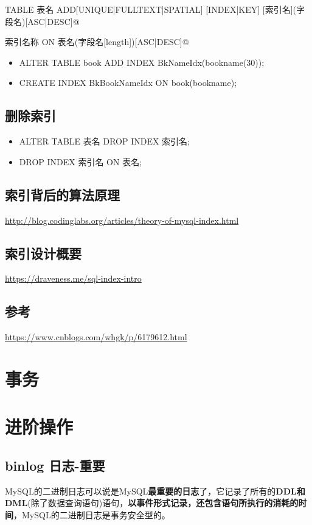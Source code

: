 \documentclass[UTF8,a4paper,12pt]{ctexbook}
\begin{document}
		\verb@ALTER TABLE 表名 ADD[UNIQUE|FULLTEXT|SPATIAL] [INDEX|KEY] [索引名](字段名)[ASC|DESC]@
		
		 索引名称 ON 表名(字段名[length])[ASC|DESC]@
		
		\begin{itemize}
			\item ALTER TABLE book ADD INDEX BkNameIdx(bookname(30));
			\item CREATE INDEX BkBookNameIdx ON book(bookname);
		\end{itemize}
	
	\section{删除索引}
		\begin{itemize}
			\item ALTER TABLE 表名 DROP INDEX 索引名;
			\item DROP INDEX 索引名 ON 表名;
		\end{itemize}
	
	\section{索引背后的算法原理}
		\url{http://blog.codinglabs.org/articles/theory-of-mysql-index.html}	
	
	
	\section{索引设计概要}
		\url{https://draveness.me/sql-index-intro}
			
	\section{参考}
		\url{https://www.cnblogs.com/whgk/p/6179612.html}
			
	
	
\chapter{事务}

	
\chapter{进阶操作} 
	\section{binlog 日志-重要}
		MySQL的二进制日志可以说是MySQL\textbf{最重要的日志}了，它记录了所有的\textbf{DDL和DML}(除了数据查询语句)语句，\textbf{以事件形式记录，还包含语句所执行的消耗的时间}，MySQL的二进制日志是事务安全型的。
		
\end{document}
